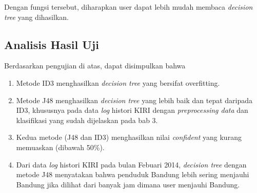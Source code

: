 Dengan fungsi tersebut, diharapkan user dapat lebih mudah membaca \textsl{decision tree} yang dihasilkan.

\subsection{Analisis Hasil Uji}

Berdasarkan pengujian di atas, dapat disimpulkan bahwa 

\begin{enumerate}
	\item Metode ID3 menghasilkan \textsl{decision tree} yang bersifat overfitting.
	\item Metode J48 menghasilkan \textsl{decision tree} yang lebih baik dan tepat daripada ID3, khususnya pada data \textsl{log} histori KIRI dengan \textsl{preprocessing data} dan klasifikasi yang sudah dijelaskan pada bab 3.
	\item Kedua metode (J48 dan ID3) menghasilkan nilai \textsl{confident} yang kurang memuaskan (dibawah 50\%).
	\item Dari data \textsl{log} histori KIRI pada bulan Febuari 2014, \textsl{decision tree} dengan metode J48 menyatakan bahwa penduduk Bandung lebih sering menjauhi Bandung jika dilihat dari banyak jam dimana user menjauhi Bandung.
\end{enumerate}













